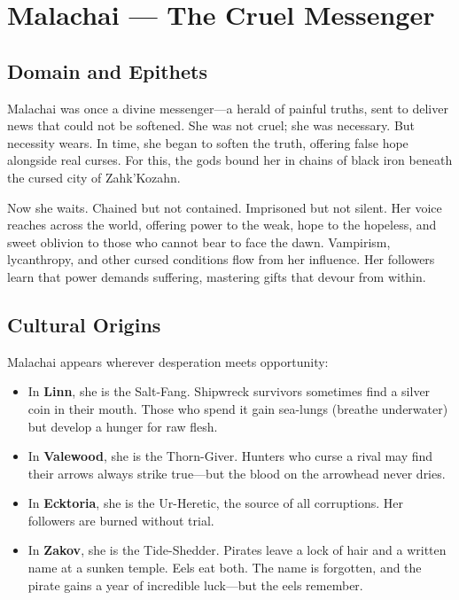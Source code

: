 \section{Malachai — The Cruel Messenger}

\subsection{Domain and Epithets}

Malachai was once a divine messenger—a herald of painful truths, sent to deliver news that could not be softened. She was not cruel; she was necessary. But necessity wears. In time, she began to soften the truth, offering false hope alongside real curses. For this, the gods bound her in chains of black iron beneath the cursed city of Zahk'Kozahn.

Now she waits. Chained but not contained. Imprisoned but not silent. Her voice reaches across the world, offering power to the weak, hope to the hopeless, and sweet oblivion to those who cannot bear to face the dawn. Vampirism, lycanthropy, and other cursed conditions flow from her influence. Her followers learn that power demands suffering, mastering gifts that devour from within.

\subsection{Cultural Origins}

Malachai appears wherever desperation meets opportunity:

\begin{itemize}
\item In \textbf{Linn}, she is the Salt-Fang. Shipwreck survivors sometimes find a silver coin in their mouth. Those who spend it gain sea-lungs (breathe underwater) but develop a hunger for raw flesh.
\item In \textbf{Valewood}, she is the Thorn-Giver. Hunters who curse a rival may find their arrows always strike true—but the blood on the arrowhead never dries.
\item In \textbf{Ecktoria}, she is the Ur-Heretic, the source of all corruptions. Her followers are burned without trial.
\item In \textbf{Zakov}, she is the Tide-Shedder. Pirates leave a lock of hair and a written name at a sunken temple. Eels eat both. The name is forgotten, and the pirate gains a year of incredible luck—but the eels remember.
\end{itemize}

